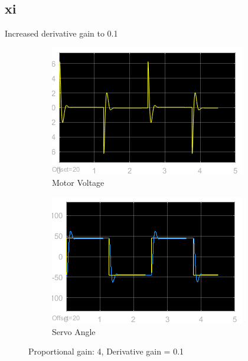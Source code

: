 \documentclass[12pt]{article}
\begin{document}
\subsection*{xi} %
Increased derivative gain to 0.1
\begin{figure}[h!]
    \centering
    \begin{subfigure}[b]{0.49\textwidth}
        \includegraphics[width=\textwidth]{xi_voltage}
        \caption{Motor Voltage}
    \end{subfigure}
    \begin{subfigure}[b]{0.49\textwidth}
        \includegraphics[width=\textwidth]{xi_angle}
        \caption{Servo Angle}        
    \end{subfigure}
    \caption{\label{fig:xi} Proportional gain: 4, Derivative gain = 0.1}
\end{figure}
\end{document}
